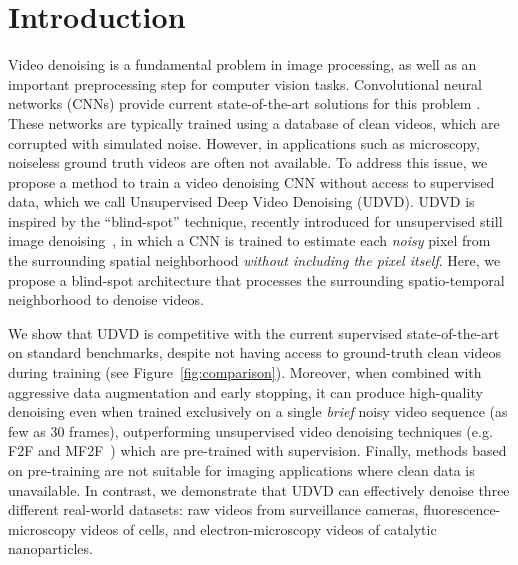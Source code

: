 \documentclass[final]{cvpr}
\begin{document}
\section{Introduction}


Video denoising is a fundamental problem in image processing, as well as an important preprocessing step for computer vision tasks. 
Convolutional neural networks (CNNs) \cite{lecun2015deep} provide current state-of-the-art solutions for this problem \cite{dvdnet, fastdvdnet, xue2019video,rawvideo,f2f, mf2f, vnlnet, videnn}. These networks are typically trained using a database of clean videos, which are corrupted with simulated noise. However, in applications such as microscopy, noiseless ground truth videos are often not available. To address this issue, we propose a  method to train a video denoising CNN without access to supervised data, which we call Unsupervised Deep Video Denoising (UDVD). 
UDVD is inspired by the ``blind-spot'' technique, recently introduced for unsupervised still image denoising~\cite{n2n, n2v, noise2self,blindspotnet}, in which a CNN is trained to estimate each {\em noisy} pixel from the surrounding spatial neighborhood \emph{without including the pixel itself}. Here, we propose a blind-spot architecture that processes the surrounding spatio-temporal neighborhood to denoise videos. 

We show that UDVD is competitive with the current supervised state-of-the-art on standard benchmarks, despite not having access to ground-truth clean videos during training (see Figure~\ref{fig:comparison}). Moreover, when combined with aggressive data augmentation and early stopping, it can produce high-quality denoising even when trained exclusively on a single \emph{brief} noisy video sequence (as few as 30 frames), outperforming unsupervised video denoising techniques (e.g. F2F\cite{f2f} and MF2F~\cite{mf2f}) which are pre-trained with supervision. Finally, methods based on pre-training are not suitable for imaging applications where clean data is unavailable. In contrast, we demonstrate that UDVD can effectively denoise three different real-world datasets: raw videos from surveillance cameras, fluorescence-microscopy videos of cells, and electron-microscopy videos of catalytic nanoparticles. 
\end{document}
